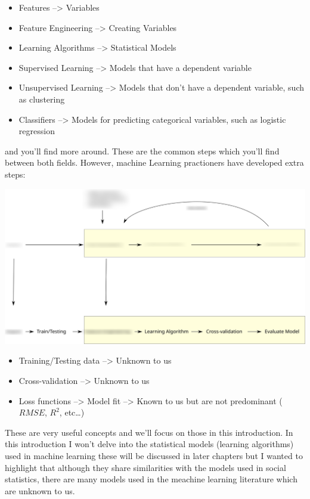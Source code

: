 \documentclass[
]{book}
\providecommand{\tightlist}{%
  \setlength{\itemsep}{0pt}\setlength{\parskip}{0pt}}
\begin{document}
\begin{itemize}
\tightlist
\item
  Features --\textgreater{} Variables
\item
  Feature Engineering --\textgreater{} Creating Variables
\item
  Learning Algorithms --\textgreater{} Statistical Models
\item
  Supervised Learning --\textgreater{} Models that have a dependent variable
\item
  Unsupervised Learning --\textgreater{} Models that don't have a dependent variable, such as clustering
\item
  Classifiers --\textgreater{} Models for predicting categorical variables, such as logistic regression
\end{itemize}

and you'll find more around. These are the common steps which you'll find between both fields. However, machine Learning practioners have developed extra steps:

\begin{center}\includegraphics[width=0.99\linewidth]{./img/socsci_wflow4_smaller} \end{center}

\begin{itemize}
\tightlist
\item
  Training/Testing data --\textgreater{} Unknown to us
\item
  Cross-validation --\textgreater{} Unknown to us
\item
  Loss functions --\textgreater{} Model fit --\textgreater{} Known to us but are not predominant (\(RMSE\), \(R^2\), etc\ldots)
\end{itemize}

These are very useful concepts and we'll focus on those in this introduction. In this introduction I won't delve into the statistical models (learning algorithms) used in machine learning these will be discussed in later chapters but I wanted to highlight that although they share similarities with the models used in social statistics, there are many models used in the meachine learning literature which are unknown to us.
\end{document}
